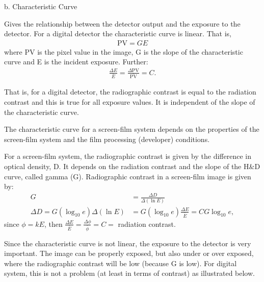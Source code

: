 \documentclass[mphy386-notes.tex]{subfiles}
\begin{document}
b. Characteristic Curve

Gives the relationship between the detector output and the exposure to the
detector. For a digital detector the characteristic curve is linear. That is,
\begin{align}
  \text{PV} = GE
\end{align}
where PV is the pixel value in the image, G is the slope of the
characteristic curve and E is the incident exposure. Further:  %
\begin{align}
  \frac{\Delta E}{\bar{E}} = \frac{\Delta \text{PV}}{\bar{\text{PV}}} = C.
\end{align}

That is, for a digital detector, the radiographic contrast is equal to the
radiation contrast and this is true for all exposure values. It is independent
of the slope of the characteristic curve.



The characteristic curve for a screen-film system depends on the properties of the
screen-film system and the film processing (developer) conditions.

For a screen-film system, the radiographic contrast is given by the difference in
optical density, D. It depends on the radiation contrast and the slope of the
H\&D curve, called gamma (G). Radiographic contrast in a screen-film image is
given by:
\begin{align}
  G &= \frac{\Delta D}{\Delta(\ln E)}\\
  \Delta D = G(\log_{10}e)\Delta(\ln E) &= G(\log_{10}e)\frac{\Delta E}{\bar{E}} = CG\log_{10}e, 
\end{align}
since $\phi = kE$, then $\frac{\Delta E}{\bar{E}} = \frac{\Delta \phi}{\bar{\phi}} = C =$ radiation contrast.

Since the characteristic curve is not linear, the exposure to the detector is
very important. The image can be properly exposed, but also under or over
exposed, where the radiographic contrast will be low (because G is low).  For
digital system, this is not a problem (at least in terms of contrast) as
illustrated below.
\end{document}
